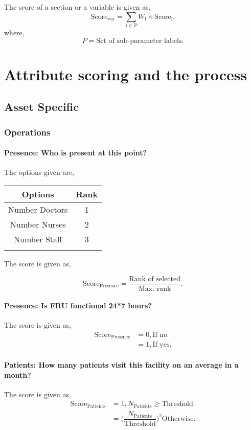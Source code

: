 \documentclass[oneside]{article}
\newcommand{\tsub}[2]{\text{#1}_{\text{#2}}}
\newcommand{\tsubb}[2]{#1_{\text{#2}}}
\newcommand{\dsub}[2]{\dfrac{\text{#1}}{\text{#2}}}
\newcommand{\singsel}[1]
{
	\[
		\tsub{Score}{#1} = \dsub{Rank of selected}{Max. rank}.
	\]
}
\newenvironment{ttable}
{
\begin{center}
\begin{tabular}{c|c}
\hline
}
{
\\ \hline
\end{tabular}
\end{center}
}
\begin{document}
The score of a section or a variable is given as,
\[
	\tsub{Score}{var} = \sum_{l \in P} \tsubb{W}{l} \times \tsub{Score}{l}.
\]
where,
\[
	P = \text{Set of sub-parameter labels.}
\]
\section{Attribute scoring and the
process}
\subsection{Asset Specific}
\subsubsection{Operations}

\paragraph{Presence: Who is present at this point?}

The options given are,
\begin{ttable}
Options & Rank \\ \hline
Number Doctors & 1 \\
Number Nurses & 2 \\
Number Staff & 3 \\
\hline
\end{ttable}
The score is given as,
\singsel{Presence}
\paragraph{Presence: Is FRU functional 24*7 hours?}

The score is given as,
\begin{align*}
\tsub{Score}{Presence} &= 0, \text{If no} \\
        &= 1, \text{If yes}.
\end{align*}
\paragraph{Patients: How many patients visit this facility on an average in a month?}

The score is given as,
\begin{align*}
\tsub{Score}{Patients} &= 1, \tsubb{N}{Patients} \ge \text{Threshold} \\
        &=
\Big(\dfrac{\tsubb{N}{Patients}}{\text{Threshold}}\Big)^{2}
\text{Otherwise}.
\end{align*}
\end{document}
